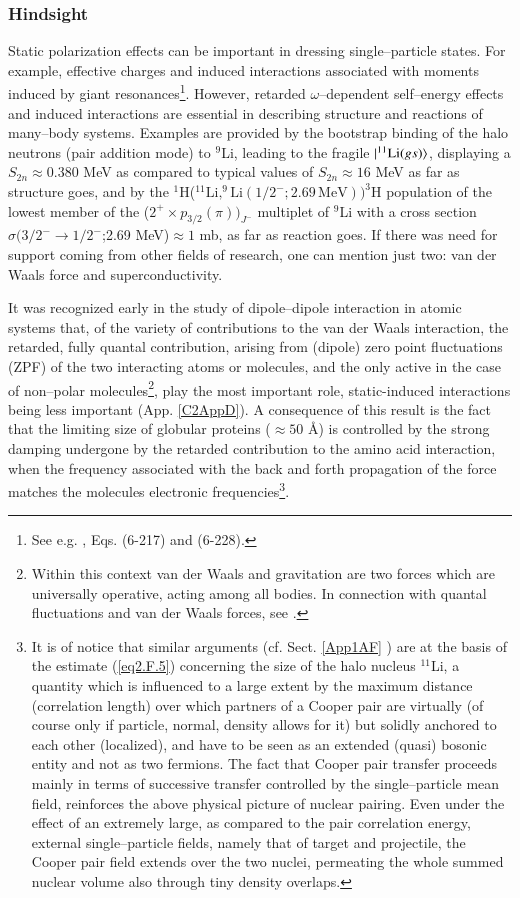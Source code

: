 \begin{subappendices}
\subsubsection{Hindsight}
Static polarization effects can be important in dressing single--particle states. For example, effective charges  and induced interactions associated with moments induced by giant resonances\footnote{See e.g. \cite{Bohr:75}, Eqs. (6-217) and (6-228).}. However, retarded $\omega$--dependent self--energy effects and induced interactions are essential in describing structure and reactions of many--body systems. Examples are provided by the bootstrap binding of the halo neutrons (pair addition mode) to $^9$Li, leading to the fragile $|{^{11}\text{Li}(gs)} \rangle$, displaying a $S_{2n}\approx0.380$ MeV as compared to typical values of $S_{2n}\approx16$ MeV as far as structure goes, and by the $^1$H($^{11}\text{Li},^9\text{Li}(1/2^-;2.69\,\text{MeV}))^3$H population of the lowest member of the ($2^+\times p_{3/2}(\pi))_{J^-}$ multiplet of $^9$Li with a cross section $\sigma(3/2^-\to1/2^-$;2.69 MeV)$\approx 1$ mb, as far as reaction goes.
If there was need for support coming from other fields of research, one can mention just two: van der Waals force and superconductivity.


It was recognized early in the study of dipole--dipole interaction in atomic systems that, of the variety of contributions to the van der Waals interaction, the retarded, fully quantal contribution, arising from (dipole) zero point fluctuations (ZPF) of the two interacting atoms or molecules, and the only active  in the case of non--polar molecules\footnote{Within this context van der Waals and gravitation are two forces which are universally operative, acting among all bodies. In connection with quantal fluctuations and van der Waals forces, see \cite{London:37}.}, play the most important role, static-induced interactions being less important (App. \ref{C2AppD}). A consequence of this result is the fact that the limiting size of globular proteins ($\approx 50$ \AA) is controlled by the strong damping undergone by the retarded contribution to the amino acid interaction, when the frequency associated with the  back and forth propagation of the force  matches the molecules electronic frequencies\footnote{It is of notice that similar arguments (cf. Sect. \ref{App1AF} ) are at the basis of the estimate (\ref{eq2.F.5}) concerning the size of the halo nucleus $^{11}$Li, a quantity which is influenced to a large extent by the maximum distance (correlation length) over which  partners of a Cooper pair are virtually (of course only if particle, normal, density allows for it) but solidly anchored to each other (localized), and have to be seen as an extended (quasi) bosonic entity and not as two fermions. The fact that Cooper pair transfer proceeds mainly in terms of successive transfer controlled by the single--particle mean field, reinforces the above physical picture of nuclear pairing. Even under the effect of an extremely large, as compared to the pair correlation energy, external single--particle fields, namely that of target and projectile, the Cooper pair field extends over the two nuclei, permeating the whole summed nuclear volume also through  tiny density overlaps.}.



\end{subappendices}
